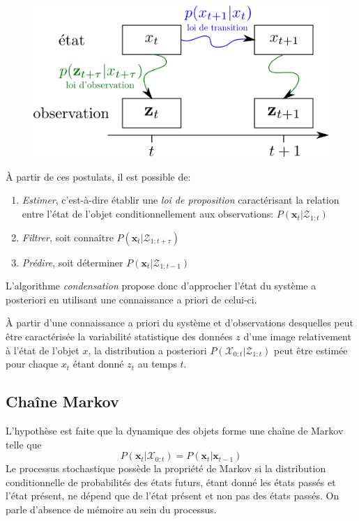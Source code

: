 \documentclass[a4paper,12pt]{report}
\begin{document}
\begin{figure}[H]
\centering
\includegraphics[scale=0.5]{figureCondensationLois.png}
\end{figure}

À partir de ces postulats, il est possible de:
\begin{enumerate}
\item \textit{Estimer}, c'est-à-dire établir une \textit{loi de proposition} caractérisant la relation entre l'état de l'objet conditionnellement aux observations: $P(\mathbf{x}_t|\mathcal{Z}_{1:t})$
\item \textit{Filtrer}, soit connaître $P(\mathbf{x}_t|\mathcal{Z}_{1:t+\tau})$
\item \textit{Prédire}, soit déterminer $P(\mathbf{x}_t|\mathcal{Z}_{1:t-1})$\\
\end{enumerate}

L'algorithme \textit{condensation} propose donc d'approcher l'état du système a posteriori en utilisant une connaissance a priori de celui-ci.
 
À partir d'une connaissance a priori du système et d'observations desquelles peut être caractérisée la variabilité statistique des données $z$ d'une image relativement à l'état de l'objet $x$, la distribution a posteriori $P(\mathcal{X}_{0:t}|\mathcal{Z}_{1:t})$ peut être estimée pour chaque $x_t$ étant donné $z_t$ au temps $t$.\\

\subsection{Chaîne Markov}
L'hypothèse est faite que la dynamique des objets forme une chaîne de Markov telle que $$P(\mathbf{x}_{t}|\mathcal{X}_{0:t})=P(\mathbf{x}_t|\mathbf{x}_{t-1})$$
Le processus stochastique possède la propriété de Markov si la distribution conditionnelle de probabilités des états futurs, étant donné les états passés et l'état présent, ne dépend que de l'état présent et non pas des états passés. 
On parle d'absence de mémoire au sein du processus.
\end{document}

